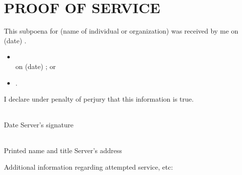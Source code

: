 \documentclass[12pt]{article}
\begin{document}
\section*{\centering PROOF OF SERVICE}

\noindent
This subpoena for \underline{\hspace{5cm}} (name of individual or organization) was received by me on (date) \underline{\hspace{4cm}}.

\begin{itemize}[leftmargin=*]
    \item {} \underline{\hspace{10cm}}\\
    on (date) \underline{\hspace{4cm}}; or
    \item {} \underline{\hspace{10cm}}.
\end{itemize}

I declare under penalty of perjury that this information is true.

\vspace{10pt}

\noindent
\makebox[3in]{\hrulefill} \hfill \makebox[3in]{\hrulefill}\\
Date \hfill Server's signature

\vspace{10pt}

\noindent
\makebox[3in]{\hrulefill} \hfill \makebox[3in]{\hrulefill}\\
Printed name and title \hfill Server's address

\vspace{20pt}

\noindent
Additional information regarding attempted service, etc:\\
\underline{\hspace{\textwidth}}
\end{document}
